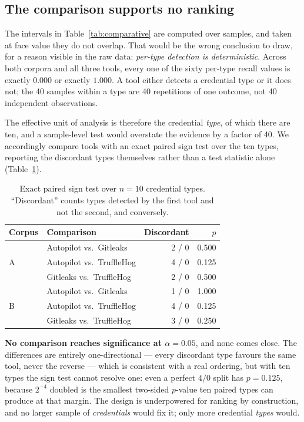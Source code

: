\documentclass[journal]{IEEEtran}
\begin{document}
\subsection{The comparison supports no ranking}
\label{sec:paired}

The intervals in Table~\ref{tab:comparative} are computed over samples, and taken at face value they do not overlap. That would be the wrong conclusion to draw, for a reason visible in the raw data: \emph{per-type detection is deterministic}. Across both corpora and all three tools, every one of the sixty per-type recall values is exactly $0.000$ or exactly $1.000$. A tool either detects a credential type or it does not; the 40 samples within a type are 40 repetitions of one outcome, not 40 independent observations.

The effective unit of analysis is therefore the credential \emph{type}, of which there are ten, and a sample-level test would overstate the evidence by a factor of 40. We accordingly compare tools with an exact paired sign test over the ten types, reporting the discordant types themselves rather than a test statistic alone (Table~\ref{tab:paired}).

\begin{table}[t]
\centering
\caption{Exact paired sign test over $n{=}10$ credential types. ``Discordant'' counts types detected by the first tool and not the second, and conversely.}
\label{tab:paired}
\small
\setlength{\tabcolsep}{4pt}
\begin{tabular}{@{}llrr@{}}
\toprule
Corpus & Comparison & Discordant & $p$ \\
\midrule
\multirow{3}{*}{A}
 & Autopilot vs.\ Gitleaks & 2 / 0 & 0.500 \\
 & Autopilot vs.\ TruffleHog & 4 / 0 & 0.125 \\
 & Gitleaks vs.\ TruffleHog & 2 / 0 & 0.500 \\
\midrule
\multirow{3}{*}{B}
 & Autopilot vs.\ Gitleaks & 1 / 0 & 1.000 \\
 & Autopilot vs.\ TruffleHog & 4 / 0 & 0.125 \\
 & Gitleaks vs.\ TruffleHog & 3 / 0 & 0.250 \\
\bottomrule
\end{tabular}
\end{table}

\textbf{No comparison reaches significance at $\alpha=0.05$}, and none comes close. The differences are entirely one-directional --- every discordant type favours the same tool, never the reverse --- which is consistent with a real ordering, but with ten types the sign test cannot resolve one: even a perfect $4/0$ split has $p = 0.125$, because $2^{-4}$ doubled is the smallest two-sided $p$-value ten paired types can produce at that margin. The design is underpowered for ranking by construction, and no larger sample of \emph{credentials} would fix it; only more credential \emph{types} would.
\end{document}
